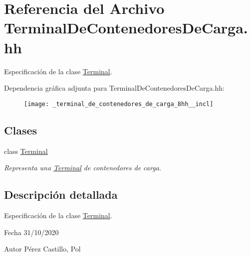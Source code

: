 \hypertarget{_terminal_de_contenedores_de_carga_8hh}{}\section{Referencia del Archivo Terminal\+De\+Contenedores\+De\+Carga.\+hh}
\label{_terminal_de_contenedores_de_carga_8hh}


Especificación de la clase \hyperlink{class_terminal}{Terminal}.  


Dependencia gráfica adjunta para Terminal\+De\+Contenedores\+De\+Carga.\+hh\+:
\nopagebreak
\begin{figure}[H]
\begin{center}
\leavevmode
\texttt{[image: \_terminal\_de\_contenedores\_de\_carga\_8hh\_\_incl]}
\end{center}
\end{figure}
\subsection*{Clases}
\begin{DoxyCompactItemize}
\item 
class \hyperlink{class_terminal}{Terminal}
\begin{DoxyCompactList}\small\item\em Representa una \hyperlink{class_terminal}{Terminal} de contenedores de carga. \end{DoxyCompactList}\end{DoxyCompactItemize}


\subsection{Descripción detallada}
Especificación de la clase \hyperlink{class_terminal}{Terminal}. 

\begin{DoxyDate}{Fecha}
31/10/2020 
\end{DoxyDate}
\begin{DoxyAuthor}{Autor}
Pérez Castillo, Pol 
\end{DoxyAuthor}
